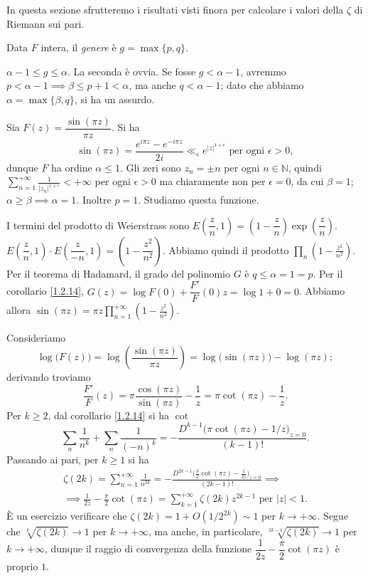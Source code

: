 In questa sezione sfrutteremo i risultati visti finora per calcolare i valori della $\zeta$ di Riemann sui pari.

\begin{defn}
  Data $F$ intera, il \textit{genere} è $g=\max\{p,q\}$.
\end{defn}

\begin{oss}
  $\alpha-1 \le g \le \alpha$. La seconda è ovvia. Se fosse $g<\alpha-1$, avremmo $p<\alpha-1 \implies \beta \le p+1<\alpha$, ma anche $q<\alpha-1$; dato che abbiamo $\alpha=\max\{\beta,q\}$, si ha un assurdo.
\end{oss}

\begin{ex}
  Sia $F(z)=\dfrac{\sin(\pi z)}{\pi z}$. Si ha
  $$\sin(\pi z)=\frac{e^{i\pi z}-e^{-i\pi z}}{2i} \ll_{\epsilon} e^{|z|^{1+\epsilon}} \text{ per ogni } \epsilon>0,$$
  dunque $F$ ha ordine $\alpha \le 1$. Gli zeri sono $z_n=\pm n$ per ogni $n \in \mathbb{N}$, quindi $\displaystyle \sum_{n=1}^{+\infty} \frac{1}{|z_n|^{1+\epsilon}}<+\infty$ per ogni $\epsilon>0$ ma chiaramente non per $\epsilon=0$, da cui $\beta=1$;
  $\alpha \ge \beta \implies \alpha=1$. Inoltre $p=1$. Studiamo questa funzione.
\end{ex}

I termini del prodotto di Weierstrass sono $E\left(\dfrac{z}{n},1\right)=\left(1-\dfrac{z}{n}\right)\exp\left(\dfrac{z}{n}\right)$. $E\left(\dfrac{z}{n},1\right) \cdot E\left(\dfrac{z}{-n},1\right)=\left(1-\dfrac{z^2}{n^2}\right)$.
Abbiamo quindi il prodotto $\displaystyle \prod_n \left(1-\frac{z^2}{n^2}\right)$. Per il teorema di Hadamard, il grado del polinomio $G$ è $q \le \alpha=1=p$. Per il corollario \ref{1.2.14}, $G(z)=\log{F(0)}+\dfrac{F'}{F}(0)z=\log{1}+0=0$.
Abbiamo allora $\displaystyle \sin(\pi z)=\pi z\prod_{n=1}^{+\infty} \left(1-\frac{z^2}{n^2}\right)$.

Consideriamo
$$\log\big(F(z)\big)=\log\left(\frac{\sin(\pi z)}{\pi z}\right)=\log\big(\sin(\pi z)\big)-\log(\pi z);$$
derivando troviamo
$$\frac{F'}{F}(z)=\pi\frac{\cos(\pi z)}{\sin(\pi z)}-\frac{1}{z}=\pi\cot(\pi z)-\frac{1}{z}.$$
Per $k \ge 2$, dal corollario \ref{1.2.14} si ha $\cot$
$$\sum_n \frac{1}{n^k}+\sum_n \frac{1}{(-n)^k}=-\frac{D^{k-1}\big(\pi\cot(\pi z)-1/z\big)_{z=0}}{(k-1)!}.$$
Passando ai pari, per $k \ge 1$ si ha
\begin{gather*}
  \zeta(2k)=\sum_{n=1}^{+\infty} \frac{1}{n^{2k}}=-\frac{D^{2k-1}\big(\frac{\pi}{2}\cot(\pi z)-\frac{1}{2z}\big)_{z=0}}{(2k-1)!} \implies \\
  \implies \frac{1}{2z}-\frac{\pi}{2}\cot(\pi z)=\sum_{k=1}^{+\infty} \zeta(2k)z^{2k-1} \text{ per } |z|<1.
\end{gather*}
È un esercizio verificare che $\zeta(2k)=1+O(1/2^{2k}) \sim 1$ per $k \longrightarrow +\infty$. Segue che $\sqrt[k]{\zeta(2k)} \longrightarrow 1$ per $k \longrightarrow +\infty$, ma anche, in particolare, $\sqrt[2k-1]{\zeta(2k)} \longrightarrow 1$ per $k \longrightarrow +\infty$, dunque il raggio di convergenza della funzione $\dfrac{1}{2z}-\dfrac{\pi}{2}\cot(\pi z)$ è proprio $1$.

